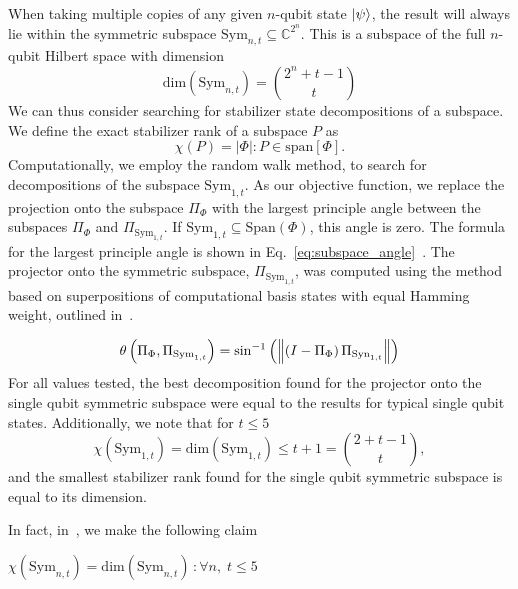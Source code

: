 When taking multiple copies of any given $n$-qubit state $\ket{\psi}$, the result will always lie within the symmetric subspace $\text{Sym}_{n,t}\subseteq \mathbb{C}^{2^{n}}$. This is a subspace of the full $n$-qubit Hilbert space with dimension
\begin{equation}
\text{dim}\left( \text{Sym}_{n,t}\right ) = \binom{2^{n}+t-1}{t}
\end{equation}
We can thus consider searching for stabilizer state decompositions of a subspace. We define the exact stabilizer rank of a subspace $P$ as
\begin{equation}
\chi\left(P\right) = \left| \Phi\right| : P\in \text{span}[\Phi].
\label{eq:subspace_srank}
\end{equation}
Computationally, we employ the random walk method, to search for decompositions of the subspace $\text{Sym}_{1,t}$. As our objective function, we replace the projection onto the subspace $\Pi_{\Phi}$ with the largest principle angle between the subspaces $\Pi_{\Phi}$ and $\Pi_{\text{Sym}_{1,t}}$. If $\text{Sym}_{1,t}\subseteq\text{Span}\left(\Phi\right)$, this angle is zero. The formula for the largest principle angle is shown in Eq.~\ref{eq:subspace_angle}~\cite{Knyazev2002}. The projector onto the symmetric subspace, $\Pi_{\text{Sym}_{1,t}}$, was computed using the method based on superpositions of computational basis states with equal Hamming weight, outlined in~\cite{Harrow2013}.\par
\begin{equation}
\theta\left(\Pi_{\Phi},\Pi_{\text{Sym}_{1,t}}\right)=\sin^{-1}\left(\norm{\left(I-\Pi_{\Phi}\right)\Pi_{\text{Syn}_{1,t}}}\right)
\label{eq:subspace_angle}
\end{equation}
For all values tested, the best decomposition found for the projector onto the single qubit symmetric subspace were equal to the results for typical single qubit states. Additionally, we note that for $t\leq 5$
\begin{equation}
\chi\left(\text{Sym}_{1,t}\right) = \text{dim}\left( \text{Sym}_{1,t}\right) \leq t+1 = \binom{2+t-1}{t},
\end{equation}
and the smallest stabilizer rank found for the single qubit symmetric subspace is equal to its dimension.\par
In fact, in~\cite{Bravyi2018}, we make the following claim
\begin{cla}
$\chi\left(\text{Sym}_{n,t}\right)=\text{dim}\left(\text{Sym}_{n,t}\right)\,:\forall n,\; t\leq 5$\label{cla:symmetric_srank}
\end{cla}

